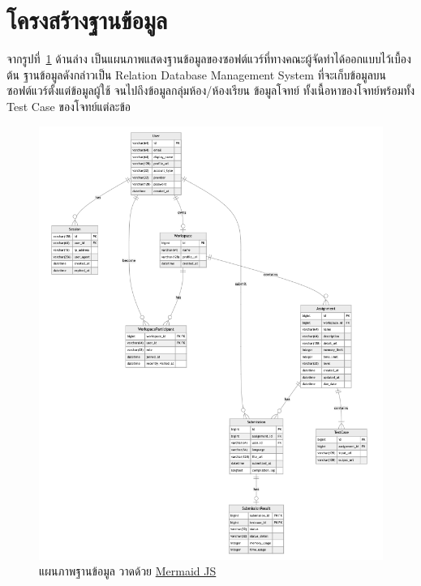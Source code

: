 \documentclass[12pt,oneside,openright,a4paper]{cpe-thai-project}
\begin{document}
\section{โครงสร้างฐานข้อมูล}
    \begin{flushleft}
    จากรูปที่~\ref{fig:database} ด้านล่าง เป็นแผนภาพแสดงฐานข้อมูลของซอฟต์แวร์ที่ทางคณะผู้จัดทำได้ออกแบบไว้เบื้องต้น ฐานข้อมูลดังกล่าวเป็น Relation Database Management System ที่จะเก็บข้อมูลบนซอฟต์แวร์ตั้งแต่ข้อมูลผู้ใช้ จนไปถึงข้อมูลกลุ่มห้อง/ห้องเรียน ข้อมูลโจทย์ ทั้งเนื้อหาของโจทย์พร้อมทั้ง Test Case ของโจทย์แต่ละข้อ
    \end{flushleft}
    \hypertarget{database}{
            \begin{figure}[H]
            \centering
                \includegraphics[width=15cm]{figure/diagram/database-v3.png}
                \caption[แผนภาพฐานข้อมูล]{แผนภาพฐานข้อมูล วาดด้วย \href{https://mermaid.js.org/}{Mermaid JS}}
                \label{fig:database}
            \end{figure}
        }
\end{document}
